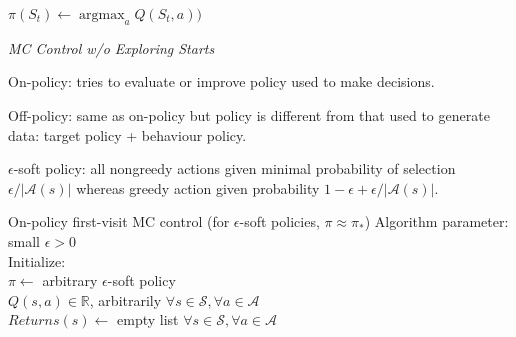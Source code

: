 \documentclass[twocolumn]{article}
\DeclareMathOperator*{\argmax}{argmax}
\begin{document}
$\pi(S_t) \leftarrow \argmax_a Q(S_t, a))$

\vspace{-.5em}
\dotfill

\textit{MC Control w/o Exploring Starts}

On-policy: tries to evaluate or improve policy used to make decisions.

Off-policy: same as on-policy but policy is different from that used to generate data: target policy + behaviour policy.

$\epsilon$-soft policy: all nongreedy actions given minimal probability of selection $\epsilon / | \mathcal A(s)|$ whereas greedy action given probability $1 - \epsilon + \epsilon/| \mathcal A(s)|$.


\cleardoublepage


\begin{mydef}{On-policy first-visit MC control (for $\epsilon$-soft policies, $\pi \approx \pi_*$)}{}
    Algorithm parameter: small $\epsilon > 0$ \\

    Initialize: \\
        \hspace*{2em}$\pi \leftarrow$ arbitrary $\epsilon$-soft policy \\
        \hspace*{2em}$Q(s, a) \in \mathbb R$, arbitrarily $\forall s \in \mathcal S, \forall a \in \mathcal A$ \\
        \hspace*{2em}$Returns(s) \leftarrow$ empty list $\forall s \in \mathcal S, \forall a \in \mathcal A$ \\


\end{mydef}
\end{document}
